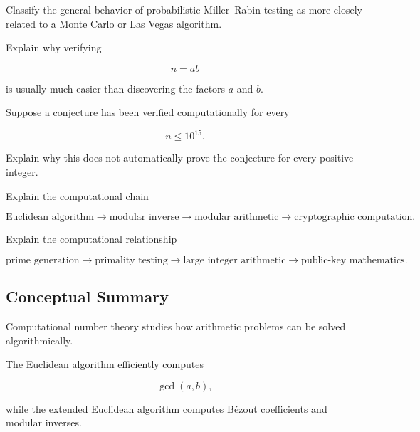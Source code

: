 \begin{exercise}[2]
Classify the general behavior of probabilistic Miller--Rabin testing as more
closely related to a Monte Carlo or Las Vegas algorithm.
\end{exercise}

\begin{exercise}[2]
Explain why verifying

\[ n=ab \]

is usually much easier than discovering the factors \(a\) and \(b\).
\end{exercise}

\begin{exercise}[3]
Suppose a conjecture has been verified computationally for every

\[ n\leq10^{15}. \]

Explain why this does not automatically prove the conjecture for every
positive integer.
\end{exercise}

\begin{exercise}[3]
Explain the computational chain

\[
\text{Euclidean algorithm}
\longrightarrow
\text{modular inverse}
\longrightarrow
\text{modular arithmetic}
\longrightarrow
\text{cryptographic computation}.
\]
\end{exercise}

\begin{exercise}[3]
Explain the computational relationship

\[
\text{prime generation}
\longrightarrow
\text{primality testing}
\longrightarrow
\text{large integer arithmetic}
\longrightarrow
\text{public-key mathematics}.
\]
\end{exercise}

\subsection{Conceptual Summary}
\label{subsec:computational-number-theory-summary}

Computational number theory studies how arithmetic problems can be solved
algorithmically.

The Euclidean algorithm efficiently computes

\[ \gcd(a,b), \]

while the extended Euclidean algorithm computes Bézout coefficients and
modular inverses.

